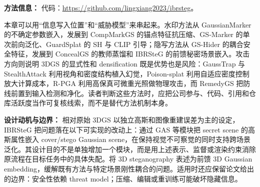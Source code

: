\textbf{方法信息：} 代码：\url{https://github.com/lingxiang2023/ibrsteg}。
\begin{takeaway}
本章可以用“信息写入位置”和“威胁模型”来串起来。水印方法从 GaussianMarker 的不确定参数嵌入，发展到 CompMarkGS 的锚点特征抗压缩、GS-Marker 的单次前向泛化、GuardSplat 的 SH 与 CLIP 引导；隐写方法从 GS-Hider 的耦合安全特征，发展到 ConcealGS 的教师蒸馏和 IBRSteG 的前馈秘密场景嵌入。攻击方向则说明 3DGS 的显式性和 densification 既是优势也是风险：GaussTrap 与 StealthAttack 利用视角和密度结构植入幻觉，Poison-splat 利用自适应密度控制放大计算成本，R-PGA 利用高保真可微重光照做物理攻击，而 RemedyGS 把防线前置到输入检测和净化。读者判断这些方法时，应把公司参与、代码、引用和仓库活跃度当作可复核线索，而不是替代方法机制本身。
\end{takeaway}
\textbf{设计动机与边界：} 相对原始 3DGS 以独立高斯和图像重建误差为主的设定，IBRSteG 把问题落在以下可实现的改动上：通过 GAS 等模块把 secret scene 的高斯属性嵌入 cover/stego Gaussian scene，在保持视觉不可察觉的同时支持跨场景泛化。其设计目的不是单独增加一个模块，而是用上述表示、监督或渲染约束消除原流程在目标任务中的具体失配。将 3D steganography 表述为前馈 3D Gaussian embedding，缓解既有方法与特定场景刚性耦合的问题。适用时还应保留论文给出的边界：安全性依赖 threat model；压缩、编辑或重训练可能破坏隐藏信息。
